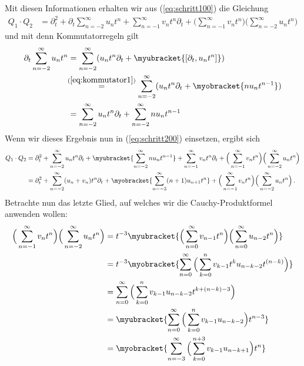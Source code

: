 Mit diesen Informationen erhalten wir aus (\ref{eq:schritt100}) die Gleichung
\begin{align} \label{eq:schritt200}
Q_1\cdot Q_2&=\partial_t^2 + \partial_t \sum_{n=-2}^\infty u_n t^n
  + \sum_{n=-1}^\infty v_nt^n \partial_t
  + \Big(\sum_{n=-1}^\infty v_nt^n \Big)\Big( \sum_{n=-2}^\infty u_n t^n \Big)
\end{align}
und mit denn Kommutatorregeln %
gilt
\begin{align*}
\partial_t \sum_{n=-2}^\infty u_n t^n &=
  \sum_{n=-2}^\infty (u_nt^n\partial_t + \myubracket{[\partial_t,u_nt^n]})
\\&\!\!\overset{{(\ref{eq:kommutator1})}}{=}
  \sum_{n=-2}^\infty (u_nt^n\partial_t +\myobracket{ nu_nt^{n-1}})
\\&= \sum_{n=-2}^\infty u_nt^n\partial_t + \sum_{n=-2}^\infty nu_nt^{n-1}
\end{align*}
Wenn wir dieses Ergebnis nun in (\ref{eq:schritt200}) einsetzen, ergibt sich
\begin{align} \label{eq:schritt300}
Q_1\cdot Q_2&=\partial_t^2 + \sum_{n=-2}^\infty u_nt^n\partial_t
  + \myubracket{\sum_{n=-2}^\infty nu_nt^{n-1}}
  + \sum_{n=-1}^\infty v_nt^n \partial_t
  + \Big(\sum_{n=-1}^\infty v_nt^n \Big)\Big( \sum_{n=-2}^\infty u_n t^n \Big)
\notag\\
&=\partial_t^2 + \sum_{n=-2}^\infty (u_n+v_n)t^n \partial_t
  + \myobracket{\sum_{n=-3}^\infty (n+1)u_{n+1}t^{n}}
  + \Big(\sum_{n=-1}^\infty v_nt^n \Big)\Big( \sum_{n=-2}^\infty u_n t^n \Big)
  \,.
\end{align}
Betrachte nun das letzte Glied, auf welches wir die Cauchy-Produktformel
anwenden wollen: %
\begin{align*}
\Big(\sum_{n=-1}^\infty v_nt^n \Big)\Big( \sum_{n=-2}^\infty u_n t^n \Big)
  &= t^{-3}
  \myubracket{\Big(\sum_{n=0}^\infty v_{n-1}t^{n} \Big)
  \Big( \sum_{n=0}^\infty u_{n-2} t^{n} \Big)}
\\&= t^{-3} \myobracket{\sum_{n=0}^\infty
  \Big( \sum_{k=0}^n v_{k-1}t^{k} u_{n-k-2} t^{(n-k)} \Big)}
\\&= \sum_{n=0}^\infty \Big( \sum_{k=0}^n v_{k-1}u_{n-k-2}t^{k+(n-k)-3} \Big)
\\&= \myubracket{
  \sum_{n=0}^\infty \Big( \sum_{k=0}^n v_{k-1} u_{n-k-2} \Big) t^{n-3}}
\\&= \myobracket{
  \sum_{n=-3}^\infty \Big( \sum_{k=0}^{n+3} v_{k-1} u_{n-k+1} \Big) t^{n} }
\end{align*}
